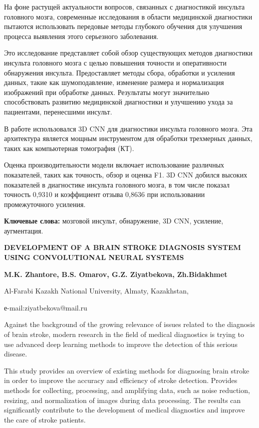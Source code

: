На фоне растущей актуальности вопросов, связанных с диагностикой
инсульта головного мозга, современные исследования в области медицинской
диагностики пытаются использовать передовые методы глубокого обучения
для улучшения процесса выявления этого серьезного заболевания.

Это исследование представляет собой обзор существующих методов
диагностики инсульта головного мозга с целью повышения точности и
оперативности обнаружения инсульта. Предоставляет методы сбора,
обработки и усиления данных, такие как шумоподавление, изменение размера
и нормализация изображений при обработке данных. Результаты могут
значительно способствовать развитию медицинской диагностики и улучшению
ухода за пациентами, перенесшими инсульт.

В работе использовался 3D CNN для диагностики инсульта головного мозга.
Эта архитектура является мощным инструментом для обработки трехмерных
данных, таких как компьютерная томография (КТ).

Оценка производительности модели включает использование различных
показателей, таких как точность, обзор и оценка F1. 3D CNN добился
высоких показателей в диагностике инсульта головного мозга, в том числе
показал точность 0,9310 и коэффициент отзыва 0,8636 при использовании
промежуточного усиления.

{\bfseries Ключевые слова:} мозговой инсульт, обнаружение, 3D CNN,
усиление, аугментация.

\begin{center}
{\large\bfseries DEVELOPMENT OF A BRAIN STROKE DIAGNOSIS SYSTEM USING
CONVOLUTIONAL NEURAL SYSTEMS}

{\bfseries M.K. Zhantore, B.S. Omarov, G.Z. Ziyatbekova, Zh.Bidakhmet}

Al-Farabi Kazakh National University, Almaty, Kazakhstan,

е-mail:ziyatbekova@mail.ru
\end{center}

Against the background of the growing relevance of issues related to the
diagnosis of brain stroke, modern research in the field of medical
diagnostics is trying to use advanced deep learning methods to improve
the detection of this serious disease.

This study provides an overview of existing methods for diagnosing brain
stroke in order to improve the accuracy and efficiency of stroke
detection. Provides methods for collecting, processing, and amplifying
data, such as noise reduction, resizing, and normalization of images
during data processing. The results can significantly contribute to the
development of medical diagnostics and improve the care of stroke
patients.


